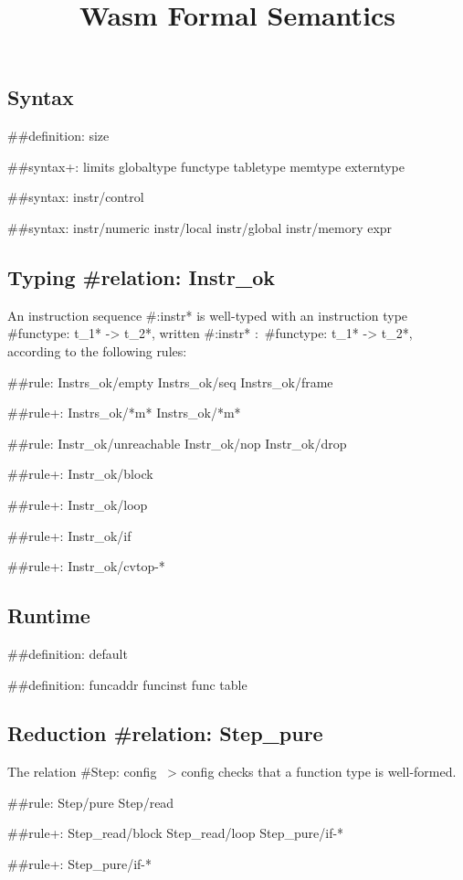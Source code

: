 \documentclass[a4paper]{scrartcl}
\title{Wasm Formal Semantics}
\begin{document}
\small

\maketitle


\subsection*{Syntax}

##{definition: size}

##{syntax+:
  limits
  {globaltype
  functype
  tabletype
  memtype}
  {}
  externtype
}

##{syntax: {instr/control}}

##{syntax: {instr/numeric instr/local instr/global instr/memory} expr}


\subsection*{Typing #{relation: Instr_ok}}

An instruction sequence #{:instr*} is well-typed with an instruction type #{functype: t_1* -> t_2*}, written #{:instr*} $:$ #{functype: t_1* -> t_2*}, according to the following rules:

##{rule:
  {Instrs_ok/empty Instrs_ok/seq}
  {Instrs_ok/frame}
}

##{rule+: Instrs_ok/*m* {Instrs_ok/*m*}}

##{rule: {Instr_ok/unreachable Instr_ok/nop Instr_ok/drop}}

##{rule+: Instr_ok/block}

##{rule+: Instr_ok/loop}

##{rule+: Instr_ok/if}


##{rule+: Instr_ok/cvtop-*}


\subsection*{Runtime}

##{definition: default}

##{definition: {funcaddr funcinst} {func table}}


\subsection*{Reduction #{relation: Step_pure}}

The relation #{Step: config ~> config} checks that a function type is well-formed.

##{rule: Step/pure Step/read}

##{rule+: {Step_read/block Step_read/loop} {Step_pure/if-*}}

##{rule+: Step_pure/if-*}
\end{document}
